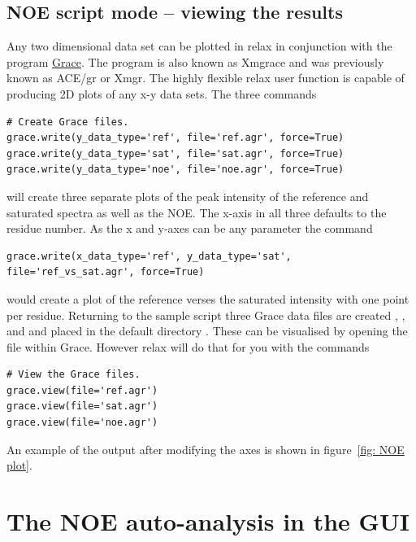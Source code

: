 \subsection{NOE script mode -- viewing the results}

Any two dimensional data set can be plotted in relax in conjunction with the program \href{http://plasma-gate.weizmann.ac.il/Grace/}{Grace}.
The program is also known as Xmgrace and was previously known as ACE/gr or Xmgr.
The highly flexible relax user function  is capable of producing 2D plots of any x-y data sets.
The three commands

\begin{lstlisting}[firstnumber=41]
# Create Grace files.
grace.write(y_data_type='ref', file='ref.agr', force=True)
grace.write(y_data_type='sat', file='sat.agr', force=True)
grace.write(y_data_type='noe', file='noe.agr', force=True)
\end{lstlisting}

will create three separate plots of the peak intensity of the reference and saturated spectra as well as the NOE.
The x-axis in all three defaults to the residue number.
As the x and y-axes can be any parameter the command

\begin{lstlisting}[numbers=none]
grace.write(x_data_type='ref', y_data_type='sat', file='ref_vs_sat.agr', force=True)
\end{lstlisting}

would create a plot of the reference verses the saturated intensity with one point per residue.
Returning to the sample script three Grace data files are created , , and  and placed in the default directory .
These can be visualised by opening the file within Grace.
However relax will do that for you with the commands

\begin{lstlisting}[firstnumber=46]
# View the Grace files.
grace.view(file='ref.agr')
grace.view(file='sat.agr')
grace.view(file='noe.agr')
\end{lstlisting}

An example of the output after modifying the axes is shown in figure~\ref{fig: NOE plot}.



\newpage
\section{The NOE auto-analysis in the GUI}

